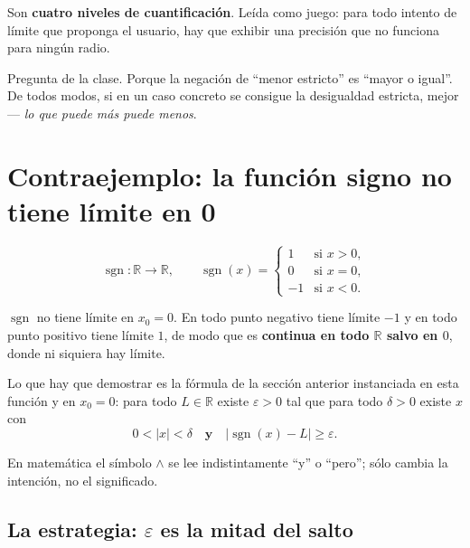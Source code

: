 \documentclass[12pt,a4paper]{article}
\begin{document}
Son \textbf{cuatro niveles de cuantificación}. Leída como juego: para todo
intento de límite que proponga el usuario, hay que exhibir una precisión que no
funciona para ningún radio.

\begin{notebox}
Pregunta de la clase. Porque la negación de ``menor estricto'' es ``mayor o
igual''. De todos modos, si en un caso concreto se consigue la desigualdad
estricta, mejor --- \emph{lo que puede más puede menos}.
\end{notebox}

\section{Contraejemplo: la función signo no tiene límite en 0}
\label{sec:signo}

\[
  \operatorname{sgn} : \mathbb{R} \to \mathbb{R}, \qquad
  \operatorname{sgn}(x) = \begin{cases}
    1 & \text{si } x > 0, \\
    0 & \text{si } x = 0, \\
    -1 & \text{si } x < 0.
  \end{cases}
\]

\begin{keybox}[Proposición]
$\operatorname{sgn}$ no tiene límite en $x_0 = 0$. En todo punto negativo tiene
límite $-1$ y en todo punto positivo tiene límite $1$, de modo que es
\textbf{continua en todo $\mathbb{R}$ salvo en $0$}, donde ni siquiera hay
límite.
\end{keybox}

Lo que hay que demostrar es la fórmula de la sección anterior instanciada en
esta función y en $x_0 = 0$: para todo $L \in \mathbb{R}$ existe
$\varepsilon > 0$ tal que para todo $\delta > 0$ existe $x$ con
\[
  0 < |x| < \delta
  \quad \textbf{y} \quad
  \left|\operatorname{sgn}(x) - L\right| \geq \varepsilon.
\]

\begin{notebox}
En matemática el símbolo $\wedge$ se lee indistintamente ``y'' o ``pero'';
sólo cambia la intención, no el significado.
\end{notebox}

\subsection{La estrategia: $\varepsilon$ es la mitad del salto}
\end{document}
